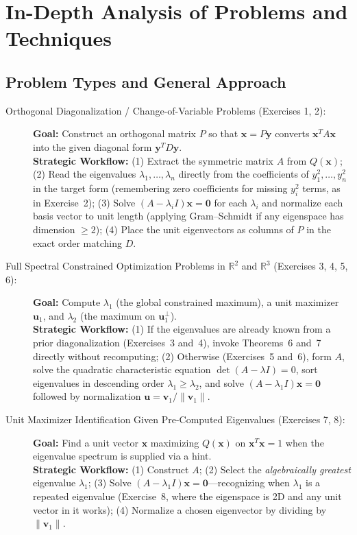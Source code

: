\documentclass[11pt, letterpaper]{article}
\theoremstyle{definition}
\theoremstyle{remark}
\newcommand{\R}{\mathbb{R}}
\begin{document}
\section{In-Depth Analysis of Problems and Techniques}

\subsection{Problem Types and General Approach}
\begin{description}
    \item[Orthogonal Diagonalization / Change-of-Variable Problems (Exercises 1, 2):]
    \textbf{Goal:} Construct an orthogonal matrix $P$ so that $\mathbf{x} = P\mathbf{y}$ converts $\mathbf{x}^T A \mathbf{x}$ into the given diagonal form $\mathbf{y}^T D \mathbf{y}$.\\
    \textbf{Strategic Workflow:} (1) Extract the symmetric matrix $A$ from $Q(\mathbf{x})$; (2) Read the eigenvalues $\lambda_1, \dots, \lambda_n$ directly from the coefficients of $y_1^2, \dots, y_n^2$ in the target form (remembering zero coefficients for missing $y_i^2$ terms, as in Exercise~2); (3) Solve $(A - \lambda_i I)\mathbf{x} = \mathbf{0}$ for each $\lambda_i$ and normalize each basis vector to unit length (applying Gram–Schmidt if any eigenspace has dimension $\ge 2$); (4) Place the unit eigenvectors as columns of $P$ in the exact order matching $D$.

    \item[Full Spectral Constrained Optimization Problems in $\R^2$ and $\R^3$ (Exercises 3, 4, 5, 6):]
    \textbf{Goal:} Compute $\lambda_1$ (the global constrained maximum), a unit maximizer $\mathbf{u}_1$, and $\lambda_2$ (the maximum on $\mathbf{u}_1^\perp$).\\
    \textbf{Strategic Workflow:} (1) If the eigenvalues are already known from a prior diagonalization (Exercises~3 and~4), invoke Theorems~6 and~7 directly without recomputing; (2) Otherwise (Exercises~5 and~6), form $A$, solve the quadratic characteristic equation $\det(A - \lambda I) = 0$, sort eigenvalues in descending order $\lambda_1 \ge \lambda_2$, and solve $(A - \lambda_1 I)\mathbf{x} = \mathbf{0}$ followed by normalization $\mathbf{u} = \mathbf{v}_1 / \|\mathbf{v}_1\|$.

    \item[Unit Maximizer Identification Given Pre-Computed Eigenvalues (Exercises 7, 8):]
    \textbf{Goal:} Find a unit vector $\mathbf{x}$ maximizing $Q(\mathbf{x})$ on $\mathbf{x}^T \mathbf{x} = 1$ when the eigenvalue spectrum is supplied via a hint.\\
    \textbf{Strategic Workflow:} (1) Construct $A$; (2) Select the \emph{algebraically greatest} eigenvalue $\lambda_1$; (3) Solve $(A - \lambda_1 I)\mathbf{x} = \mathbf{0}$—recognizing when $\lambda_1$ is a repeated eigenvalue (Exercise~8, where the eigenspace is 2D and any unit vector in it works); (4) Normalize a chosen eigenvector by dividing by $\|\mathbf{v}_1\|$.


\end{description}
\end{document}
